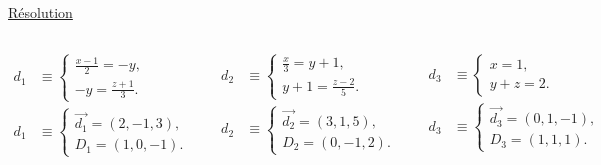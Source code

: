 \documentclass[10pt]{beamer}
\newcommand{\vect}[1] {
  \overrightarrow{#1}}
\begin{document}
{\begin{tcolorbox}[basic]
\begin{columns}[c]
\begin{enumerate}
				      \end{enumerate}

				    \end{columns}
				    \end{tcolorbox}
	
		\centering\underline{Résolution}\\ \flushleft
		\medskip
		\begin{columns}[c]
	
		\centering
		\begin{align*}
	        d_1 &\equiv \begin{cases} 
		      \frac{x-1}{2} = -y, \\
		      -y = \frac{z+1}{3}.
			    \end{cases} \\ 			    
	        d_1 &\equiv \begin{cases}
		            \vect{d_1} = (2,-1,3), \\
		            D_1 = (1,0,-1).
		            \end{cases}      
		\end{align*}
					       
		\centering			       
		 \begin{align*}
	        d_2 &\equiv \begin{cases} 
		      \frac{x}{3}=y+1, \\
		      y+1=\frac{z-2}{5}.
			    \end{cases} \\ 			    
	        d_2 &\equiv \begin{cases}
		            \vect{d_2} = (3,1,5), \\
		            D_2 = (0,-1,2).
		            \end{cases}      
		\end{align*}
	
		\centering
		\begin{align*}
	        d_3 &\equiv \begin{cases} 
		      x=1, \\
		      y+z=2.
			    \end{cases} \\ 			    
	        d_3 &\equiv \begin{cases}
		            \vect{d_3} = (0,1,-1), \\
		            D_3 = (1,1,1).
		            \end{cases}      
		\end{align*}
		\end{columns}
		\bigskip
		\begin{columns}[c]


\end{columns}}
\end{document}
